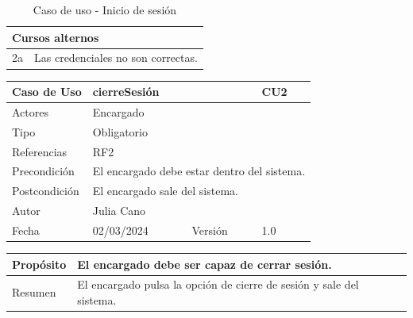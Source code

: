 \begin{table}[H]
	\centering
	\begin{tabular}{| m{} | m{} | m{} | m{} |}
		\hline
		\multicolumn{4}{|m{0.9\textwidth}|}{Cursos alternos}     \\ 
		\hline
		2a & \multicolumn{3}{l|}{Las credenciales no son correctas.} \\ 
		\hline
	\end{tabular}
	\caption{Caso de uso - Inicio de sesión}
\end{table}

\newpage


\begin{table}[H]
	\centering
	\begin{tabular}{| m{} | m{} | m{} | m{} |}
		\hline
		\rowcolor{grayshade} Caso de Uso & \multicolumn{2}{|m{0.43\textwidth}|}{cierreSesión} &  CU2\\ 
		\hline
		Actores & \multicolumn{3}{l|}{Encargado} \\ 
		\hline
		Tipo & \multicolumn{3}{l|}{Obligatorio} \\ 
		\hline
		Referencias & \multicolumn{3}{l|}{RF2} \\ 
		\hline
		Precondición & \multicolumn{3}{l|}{El encargado debe estar dentro del sistema.} \\ 
		\hline
		Postcondición & \multicolumn{3}{l|}{El encargado sale del sistema.} \\ 
		\hline
		Autor & \multicolumn{3}{l|}{Julia Cano} \\ 
		\hline
		Fecha & 02/03/2024 & Versión & 1.0 \\
		\hline
	\end{tabular}
\end{table}

\begin{table}[H]
	\centering
	\begin{tabular}{| m{} | m{} | m{} | m{} |}
		\hline
		Propósito & \multicolumn{3}{m{0.67\textwidth}|}{El encargado debe ser capaz de cerrar sesión.}   \\ 
		\hline
		Resumen & \multicolumn{3}{m{0.67\textwidth}|}{El encargado pulsa la opción de cierre de sesión y sale del sistema.} \\ 
		\hline
	\end{tabular}
\end{table}

